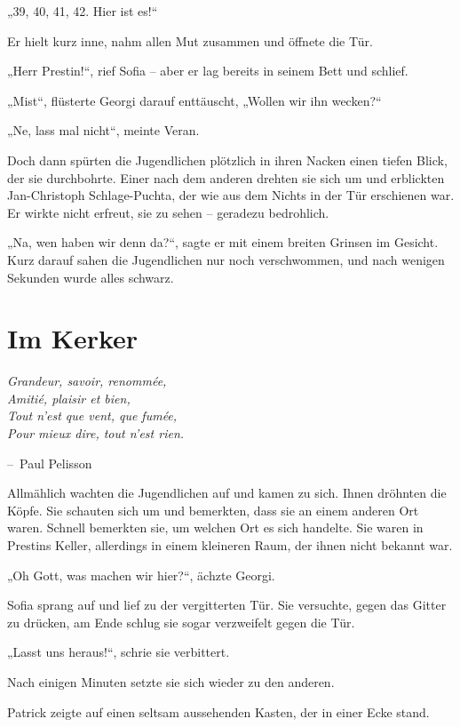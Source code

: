 \documentclass[oneside]{memoir}
\makeatletter
\newenvironment{chapquote}[2][2em]
  {\setlength{\@tempdima}{#1}%
   \def\chapquote@author{#2}%
   \parshape 1 \@tempdima \dimexpr\textwidth-2\@tempdima\relax%
   \itshape}
  {\par\normalfont\hfill--\ \chapquote@author\hspace*{\@tempdima}\par\bigskip}
\makeatother
\begin{document}
„39, 40, 41, 42. Hier ist es!“

Er hielt kurz inne, nahm allen Mut zusammen und öffnete die Tür.

„Herr Prestin!“, rief Sofia – aber er lag bereits in seinem Bett und schlief.

„Mist“, flüsterte Georgi darauf enttäuscht, „Wollen wir ihn wecken?“

„Ne, lass mal nicht“, meinte Veran.

Doch dann spürten die Jugendlichen plötzlich in ihren Nacken einen tiefen Blick, der sie durchbohrte. Einer nach dem anderen drehten sie sich um und erblickten Jan-Christoph Schlage-Puchta, der wie aus dem Nichts in der Tür erschienen war. Er wirkte nicht erfreut, sie zu sehen – geradezu bedrohlich.

„Na, wen haben wir denn da?“, sagte er mit einem breiten Grinsen im Gesicht. Kurz darauf sahen die Jugendlichen nur noch verschwommen, und nach wenigen Sekunden wurde alles schwarz.

     
     
\chapter{Im Kerker} %
\begin{chapquote}{Paul Pelisson}
\glqq Grandeur, savoir, renommée, \\
Amitié, plaisir et bien, \\
Tout n’est que vent, que fumée, \\
Pour mieux dire, tout n’est rien.\grqq
\end{chapquote}

Allmählich wachten die Jugendlichen auf und kamen zu sich. Ihnen dröhnten die Köpfe. Sie schauten sich um und bemerkten, dass sie an einem anderen Ort waren. Schnell bemerkten sie, um welchen Ort es sich handelte. Sie waren in Prestins Keller, allerdings in einem kleineren Raum, der ihnen nicht bekannt war.

„Oh Gott, was machen wir hier?“, ächzte Georgi.

Sofia sprang auf und lief zu der vergitterten Tür. Sie versuchte, gegen das Gitter zu drücken, am Ende schlug sie sogar verzweifelt gegen die Tür.

„Lasst uns heraus!“, schrie sie verbittert.

Nach einigen Minuten setzte sie sich wieder zu den anderen.

Patrick zeigte auf einen seltsam aussehenden Kasten, der in einer Ecke stand.
\end{document}
